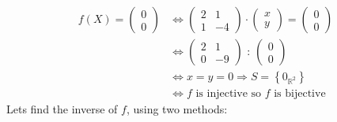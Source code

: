\documentclass[notitlepage]{math}
\begin{document}
\begin{align*}   
    f(X)  = \begin{pmatrix} 0 \\ 0 \end{pmatrix} &\Longleftrightarrow \begin{pmatrix} 2 & 1 \\
        1 & -4
    \end{pmatrix} \cdot \begin{pmatrix} x \\ y \end{pmatrix} = \begin{pmatrix} 0 \\ 0 \end{pmatrix} \\
    &\Longleftrightarrow
    \begin{pmatrix}
        2 & 1 \\
        0 & -9
    \end{pmatrix} \text{ : } \begin{pmatrix} 0 \\ 0 \end{pmatrix} \\
    &\Longleftrightarrow x = y = 0 \Rightarrow S = \left\{ 0_{\mathbb{R}^2} \right\} \\ 
    &\Leftrightarrow f \text{ is injective so } f \text{ is bijective}
\end{align*}
Lets find the inverse of $f$, using two methods: \\
\end{document}
